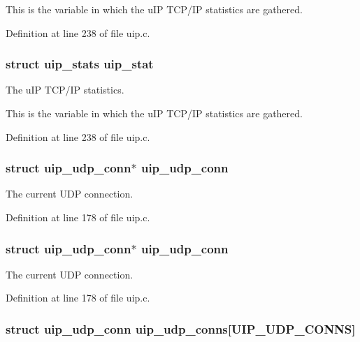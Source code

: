 This is the variable in which the uIP TCP/IP statistics are gathered. 

Definition at line 238 of file uip.c.

\hypertarget{group__uip_ga9ee50a40597e67fce96541ab56c3b712}{
\subsubsection[{uip\_\-stat}]{\setlength{\rightskip}{0pt plus 5cm}struct {\bf uip\_\-stats} {\bf uip\_\-stat}}}
\label{group__uip_ga9ee50a40597e67fce96541ab56c3b712}
The uIP TCP/IP statistics.

This is the variable in which the uIP TCP/IP statistics are gathered. 

Definition at line 238 of file uip.c.

\hypertarget{group__uip_ga210f227119fc972e6222c9cb452e15a9}{
\subsubsection[{uip\_\-udp\_\-conn}]{\setlength{\rightskip}{0pt plus 5cm}struct {\bf uip\_\-udp\_\-conn}$\ast$ {\bf uip\_\-udp\_\-conn}}}
\label{group__uip_ga210f227119fc972e6222c9cb452e15a9}
The current UDP connection. 

Definition at line 178 of file uip.c.

\hypertarget{group__uip_ga210f227119fc972e6222c9cb452e15a9}{
\subsubsection[{uip\_\-udp\_\-conn}]{\setlength{\rightskip}{0pt plus 5cm}struct {\bf uip\_\-udp\_\-conn}$\ast$ {\bf uip\_\-udp\_\-conn}}}
\label{group__uip_ga210f227119fc972e6222c9cb452e15a9}
The current UDP connection. 

Definition at line 178 of file uip.c.

\hypertarget{group__uip_gaeb533744817cf6695d75293369c2248b}{
\subsubsection[{uip\_\-udp\_\-conns}]{\setlength{\rightskip}{0pt plus 5cm}struct {\bf uip\_\-udp\_\-conn} {\bf uip\_\-udp\_\-conns}\mbox{[}UIP\_\-UDP\_\-CONNS\mbox{]}}}
\label{group__uip_gaeb533744817cf6695d75293369c2248b}


